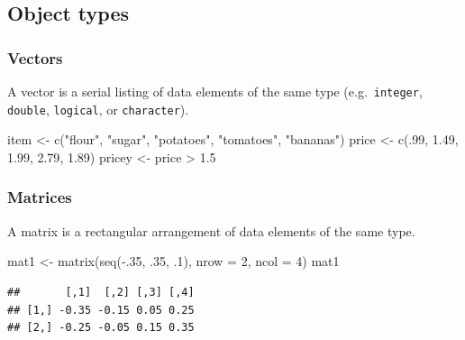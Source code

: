 \documentclass[
  11pt,
]{article}
\newenvironment{Shaded}{\begin{snugshade}}{\end{snugshade}}
\newcommand{\AttributeTok}[1]{\textcolor[rgb]{0.77,0.63,0.00}{#1}}
\newcommand{\DecValTok}[1]{\textcolor[rgb]{0.00,0.00,0.81}{#1}}
\newcommand{\FloatTok}[1]{\textcolor[rgb]{0.00,0.00,0.81}{#1}}
\newcommand{\FunctionTok}[1]{\textcolor[rgb]{0.00,0.00,0.00}{#1}}
\newcommand{\NormalTok}[1]{#1}
\newcommand{\OtherTok}[1]{\textcolor[rgb]{0.56,0.35,0.01}{#1}}
\newcommand{\SpecialCharTok}[1]{\textcolor[rgb]{0.00,0.00,0.00}{#1}}
\newcommand{\StringTok}[1]{\textcolor[rgb]{0.31,0.60,0.02}{#1}}
\begin{document}
\hypertarget{object-types}{%
\subsection{Object types}\label{object-types}}

\hypertarget{vectors}{%
\subsubsection{Vectors}\label{vectors}}

A vector is a serial listing of data elements of the same type (e.g.~\texttt{integer}, \texttt{double}, \texttt{logical}, or \texttt{character}).

\begin{Shaded}
\begin{Highlighting}[]
\NormalTok{item }\OtherTok{\textless{}{-}} \FunctionTok{c}\NormalTok{(}\StringTok{"flour"}\NormalTok{, }\StringTok{"sugar"}\NormalTok{, }\StringTok{"potatoes"}\NormalTok{, }\StringTok{"tomatoes"}\NormalTok{, }\StringTok{"bananas"}\NormalTok{)}
\NormalTok{price }\OtherTok{\textless{}{-}} \FunctionTok{c}\NormalTok{(.}\DecValTok{99}\NormalTok{, }\FloatTok{1.49}\NormalTok{, }\FloatTok{1.99}\NormalTok{, }\FloatTok{2.79}\NormalTok{, }\FloatTok{1.89}\NormalTok{)}
\NormalTok{pricey }\OtherTok{\textless{}{-}}\NormalTok{ price }\SpecialCharTok{\textgreater{}} \FloatTok{1.5}
\end{Highlighting}
\end{Shaded}

\hypertarget{matrices}{%
\subsubsection{Matrices}\label{matrices}}

A matrix is a rectangular arrangement of data elements of the same type.

\begin{Shaded}
\begin{Highlighting}[]
\NormalTok{mat1 }\OtherTok{\textless{}{-}} \FunctionTok{matrix}\NormalTok{(}\FunctionTok{seq}\NormalTok{(}\SpecialCharTok{{-}}\NormalTok{.}\DecValTok{35}\NormalTok{, .}\DecValTok{35}\NormalTok{, .}\DecValTok{1}\NormalTok{), }\AttributeTok{nrow =} \DecValTok{2}\NormalTok{, }\AttributeTok{ncol =} \DecValTok{4}\NormalTok{)}
\NormalTok{mat1}
\end{Highlighting}
\end{Shaded}

\begin{verbatim}
##       [,1]  [,2] [,3] [,4]
## [1,] -0.35 -0.15 0.05 0.25
## [2,] -0.25 -0.05 0.15 0.35
\end{verbatim}
\end{document}
